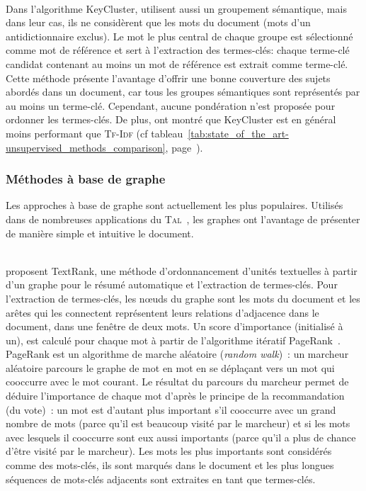         ~\\Dans l'algorithme KeyCluster,  utilisent
        aussi un groupement sémantique, mais dans leur cas, ils ne considèrent
        que les mots du document (mots d'un antidictionnaire exclus). Le mot le
        plus central de chaque groupe est sélectionné comme mot de référence et
        sert à l'extraction des termes-clés: chaque terme-clé candidat contenant
        au moins un mot de référence est extrait comme terme-clé. Cette méthode
        présente l'avantage d'offrir une bonne couverture des sujets abordés
        dans un document, car tous les groupes sémantiques sont représentés par
        au moins un terme-clé. Cependant, aucune pondération n'est proposée pour
        ordonner les termes-clés. De plus,  ont
        montré que KeyCluster est en général moins performant que \textsc{Tf-Idf}
        (cf tableau~\ref{tab:state_of_the_art-unsupervised_methods_comparison},
        page~\pageref{tab:state_of_the_art-unsupervised_methods_comparison}).

      \subsubsection{Méthodes à base de graphe}
      \label{subsubsec:main-state_of_the_art-automatic_keyphrase_extraction-unsupervised_keyphrase_extraction-graph_based_approaches}
        Les approches à base de graphe sont actuellement les plus populaires.
        Utilisés dans de nombreuses applications du
        \textsc{Tal}~\cite{kozareva2013textgraphs}, les graphes ont l'avantage
        de présenter de manière simple et intuitive le document.

        ~\\ proposent TextRank, une méthode
        d'ordonnancement d'unités textuelles à partir d'un graphe pour le résumé
        automatique et l'extraction de termes-clés. Pour l'extraction de
        termes-clés, les n\oe{}uds du graphe sont les mots du document et les
        arêtes qui les connectent représentent leurs relations d'adjacence dans
        le document, dans une fenêtre de deux mots. Un score
        d'importance (initialisé à un), est calculé pour chaque mot à partir de
        l'algorithme itératif PageRank~\cite{brin1998pagerank}. PageRank est un
        algorithme de marche aléatoire (\textit{random walk})~: un marcheur
        aléatoire parcours le graphe de mot en mot en se déplaçant vers un mot
        qui cooccurre avec le mot courant. Le résultat du parcours du marcheur
        permet de déduire l'importance de chaque mot d'après le principe de la
        recommandation (du vote)~:  un mot est d'autant plus important s'il
        cooccurre avec un grand nombre de mots (parce qu'il est beaucoup visité
        par le marcheur) et si les mots avec lesquels il cooccurre sont eux
        aussi importants (parce qu'il a plus de chance d'être visité par le
        marcheur). Les mots les plus importants sont considérés comme des
        mots-clés, ils sont marqués dans le document et les plus longues
        séquences de mots-clés adjacents sont extraites en tant que termes-clés.
      
